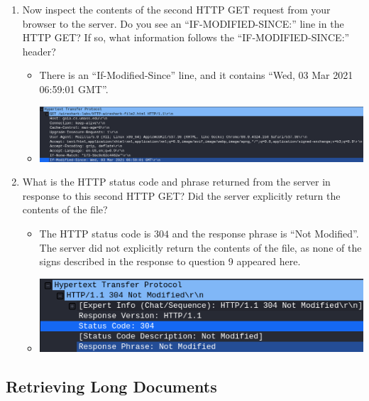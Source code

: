 \documentclass[11pt]{article}
\begin{document}
\begin{enumerate}
\begin{itemize}
  \end{itemize}
\item Now inspect the contents of the second HTTP GET request from your browser
  to the server.  Do you see an ``IF-MODIFIED-SINCE:'' line in the HTTP GET?  If
  so, what information follows the ``IF-MODIFIED-SINCE:'' header?
  \begin{itemize}
  \item There is an ``If-Modified-Since'' line, and it contains ``Wed, 03 Mar
    2021 06:59:01 GMT''.
  \item \includegraphics[width=\textwidth]{img/ws-if-modified-since-2}
  \end{itemize}
\item What is the HTTP status code and phrase returned from the server in
  response to this second HTTP GET?  Did the server explicitly return the
  contents of the file?
  \begin{itemize}
  \item The HTTP status code is $304$ and the response phrase is ``Not
    Modified''.  The server did not explicitly return the contents of the file,
    as none of the signs described in the response to question 9 appeared
    here.
  \item \includegraphics[width=\textwidth]{img/ws-conditional-status-phrase}
  \end{itemize}
\end{enumerate}


\subsection{Retrieving Long Documents}
\end{document}
